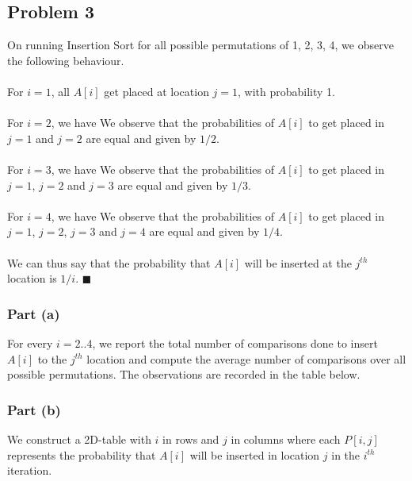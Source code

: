 \documentclass{article}
\begin{document}
\subsection{Problem 3}
On running Insertion Sort for all possible permutations of 1, 2, 3, 4, we observe the following behaviour.\\~\\
For $i=1$, all $A[i]$ get placed at location $j=1$, with probability 1.\\~\\
For $i=2$, we have
We observe that the probabilities of $A[i]$ to get placed in $j=1$ and $j=2$ are equal and given by $1/2$.\\~\\
For $i=3$, we have
We observe that the probabilities of $A[i]$ to get placed in $j=1$, $j=2$ and $j=3$ are equal and given by $1/3$.\\~\\
For $i=4$, we have
We observe that the probabilities of $A[i]$ to get placed in $j=1$, $j=2$, $j=3$ and $j=4$ are equal and given by $1/4$.\\\\
We can thus say that the probability that $A[i]$ will be inserted at the $j^{th}$ location is $1/i$. $\blacksquare$
\subsubsection{Part (a)}
For every $i=2..4$, we report the total number of comparisons done to insert $A[i]$ to the $j^{th}$ location and compute the average number of comparisons over all possible permutations. The observations are recorded in the table below.
\subsubsection{Part (b)}
We construct a 2D-table with $i$ in rows and $j$ in columns where each $P[i,j]$ represents the probability that $A[i]$ will be inserted in location $j$ in the $i^{th}$ iteration.
\end{document}

